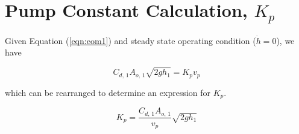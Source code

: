 \documentclass[12pt]{article}
\numberwithin{equation}{subsection}
\begin{document}
  \section{Pump Constant Calculation, $ K_p $}

  Given Equation (\ref{eqn:eom1}) and steady state operating condition ($ \dot h = 0 $), we have

  \begin{equation}
    C_{d, \, 1} A_{o, \, 1} \sqrt{2gh_1} = K_p v_p
  \end{equation}

  which can be rearranged to determine an expression for $ K_p. $

  \begin{equation}
    K_p = \frac{C_{d, \, 1} A_{o, \, 1} }{v_p} \sqrt{2gh_1}
  \end{equation}
\end{document}
